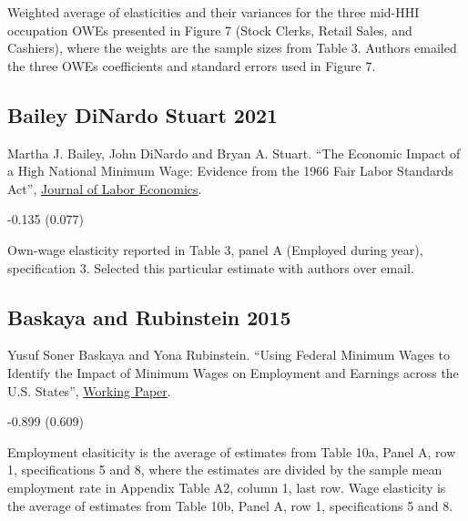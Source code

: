 \vspace{0.7em}

 Weighted average of elasticities and their variances for the three mid-HHI occupation OWEs presented in Figure 7 (Stock Clerks, Retail Sales, and Cashiers), where the weights are the sample sizes from Table 3. Authors emailed the three OWEs coefficients and standard errors used in Figure 7.

\subsection*{Bailey DiNardo Stuart 2021}
\vspace{-0.7em}

\noindent Martha J. Bailey, John DiNardo and Bryan A. Stuart. ``The Economic Impact of a High National Minimum Wage: Evidence from the 1966 Fair Labor Standards Act'', \href{https://doi.org/10.1086/712554}{Journal of Labor Economics}.

\vspace{0.7em}

 -0.135 (0.077)

\vspace{0.7em}

 Own-wage elasticity reported in Table 3, panel A (Employed during year), specification 3. Selected this particular estimate with authors over email.

\subsection*{Baskaya and Rubinstein 2015}
\vspace{-0.7em}

\noindent Yusuf Soner Baskaya and Yona Rubinstein. ``Using Federal Minimum Wages to Identify the Impact of Minimum Wages on Employment and Earnings across the U.S. States'', \href{NA}{Working Paper}.

\vspace{0.7em}

 -0.899 (0.609)

\vspace{0.7em}

 Employment elasiticity is the average of estimates from Table 10a, Panel A, row 1, specifications 5 and 8, where the estimates are divided by the sample mean employment rate in Appendix Table A2, column 1, last row. Wage elasticity is the average of estimates from Table 10b, Panel A, row 1, specifications 5 and 8.

